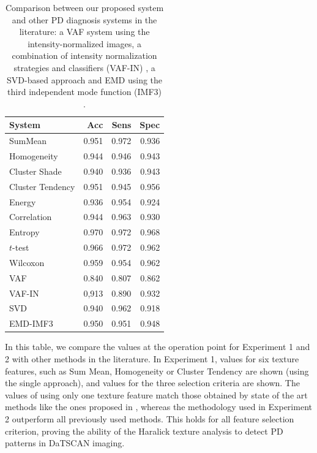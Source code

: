\begin{table}[ht]
	\centering
	\begin{tabular}{l | rrr}
		\toprule
		\textbf{System}		& \textbf{Acc} 	& \textbf{Sens}	& \textbf{Spec}	\\ 
		\midrule
		SumMean &  0.951 &    0.972 &    0.936 \\ 
		Homogeneity &  0.944 &    0.946 &    0.943\\
		Cluster Shade &   0.940 &    0.936 &    0.943  \\
		Cluster Tendency &  0.951 &    0.945 &    0.956\\
		Energy &  0.936 &    0.954 &    0.924\\
		Correlation &  0.944 &    0.963 &     0.930\\
		\midrule
		Entropy       & 0.970 & 0.972 & 0.968 \\
		$t$-test       & 0.966 & 0.972 & 0.962  \\
		Wilcoxon & 0.959 & 0.954 & 0.962  \\
		\midrule
		VAF & 0.840	& 0.807	& 0.862	 \\
		VAF-IN & 0,913 & 0.890 & 0.932 \\
		SVD & 0.940 & 0.962 & 0.918 \\
		EMD-IMF3 & 0.950 & 0.951 & 0.948 \\
		\bottomrule
	\end{tabular}
	\vspace{10pt}
	\caption[Comparison between our proposed system and other \ac{PD} diagnosis systems in the literature.]{Comparison between our proposed system and other \ac{PD} diagnosis systems in the literature: a VAF system using the intensity-normalized images,  a combination of intensity normalization strategies and classifiers (VAF-IN) \cite{Illan2012}, a SVD-based approach \cite{Segovia2012} and EMD using the third independent mode function (IMF3) \cite{Rojas2012}.}
	\label{tab:comparison}
\end{table}

In this table, we compare the values at the operation point for Experiment 1 and 2 with other methods in the literature. In Experiment 1, values for six texture features, such as Sum Mean, Homogeneity or Cluster Tendency are shown (using the single approach), and values for the three selection criteria are shown. The values of using only one texture feature match those obtained by state of the art methods like the ones proposed in \cite{Segovia2012,Rojas2012}, whereas the methodology used in Experiment 2 outperform all previously used methods. This holds for all feature selection criterion, proving the ability of the Haralick texture analysis to detect \ac{PD} patterns in DaTSCAN imaging. 
